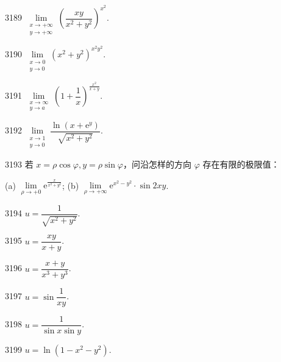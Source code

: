 \begin{prob}[S]{3189}
$\lim\limits_{\substack{x \to +\infty \\ y \to +\infty}} \left(\dfrac{xy}{x^2 + y^2}\right)^{x^2}$.
\end{prob}

\begin{prob}[S]{3190}
$\lim\limits_{\substack{x \to 0 \\ y \to 0}} (x^2 + y^2)^{x^2 y^2}$.
\end{prob}

\begin{prob}[S]{3191}
$\lim\limits_{\substack{x \to \infty \\ y \to a}} \left(1 + \dfrac{1}{x}\right)^{\frac{x^2}{x + y}}$.
\end{prob}

\begin{prob}[S]{3192}
$\lim\limits_{\substack{x \to 1 \\ y \to 0}} \dfrac{\ln(x + \mathrm{e}^y)}{\sqrt{x^2 + y^2}}$.
\end{prob}

\begin{prob}[M]{3193}
若 $x = \rho\cos\varphi, y = \rho\sin\varphi$，问沿怎样的方向 $\varphi$ 存在有限的极限值：

(a) $\lim\limits_{\rho \to +0} \mathrm{e}^{\frac{x}{x^2 + y^2}}$; \qquad (b) $\lim\limits_{\rho \to +\infty} \mathrm{e}^{x^2 - y^2} \cdot \sin 2xy$.
\end{prob}


\begin{prob}[S]{3194}
$u = \dfrac{1}{\sqrt{x^2 + y^2}}$.
\end{prob}

\begin{prob}[S]{3195}
$u = \dfrac{xy}{x + y}$.
\end{prob}

\begin{prob}[S]{3196}
$u = \dfrac{x + y}{x^3 + y^3}$.
\end{prob}

\begin{prob}[S]{3197}
$u = \sin\dfrac{1}{xy}$.
\end{prob}

\begin{prob}[S]{3198}
$u = \dfrac{1}{\sin x \sin y}$.
\end{prob}

\begin{prob}[S]{3199}
$u = \ln(1 - x^2 - y^2)$.
\end{prob}

